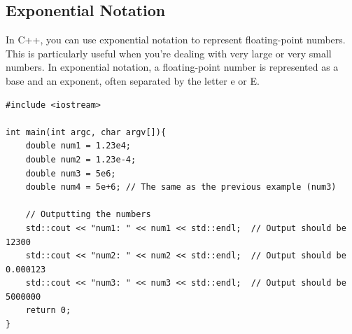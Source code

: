\documentclass{report}
\begin{document}
    \subsection{Exponential Notation}
    \bigbreak \noindent 
    In C++, you can use exponential notation to represent floating-point numbers. This is particularly useful when you're dealing with very large or very small numbers. In exponential notation, a floating-point number is represented as a base and an exponent, often separated by the letter e or E.
    \bigbreak \noindent 
    \sepline
    \begin{verbatim}
#include <iostream>

int main(int argc, char argv[]){
    double num1 = 1.23e4;
    double num2 = 1.23e-4;
    double num3 = 5e6;
    double num4 = 5e+6; // The same as the previous example (num3)

    // Outputting the numbers
    std::cout << "num1: " << num1 << std::endl;  // Output should be 12300
    std::cout << "num2: " << num2 << std::endl;  // Output should be 0.000123
    std::cout << "num3: " << num3 << std::endl;  // Output should be 5000000
    return 0;
}
    \end{verbatim}
    \sepline
    \bigbreak \noindent 
    \bigbreak \noindent 
%
%
%
%

    \bigbreak \noindent   
\end{document}
